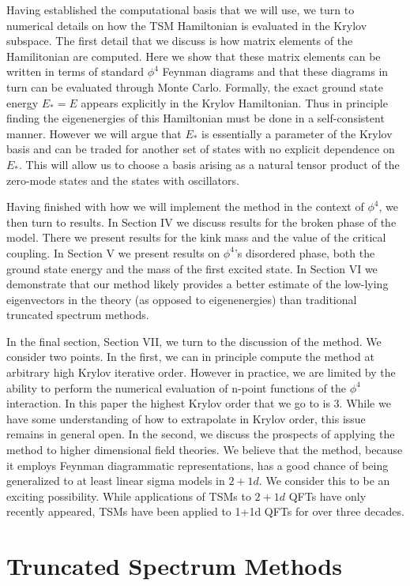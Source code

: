 \documentclass[twocolumn,secnumarabic,amssymb, nobibnotes, aps, prd]{revtex4-2}
\begin{document}
Having established the computational basis that we will use, we turn to numerical details on how the TSM Hamiltonian is evaluated in the Krylov subspace.  The first detail that we discuss is how matrix elements of the Hamilitonian are computed.  Here we show that these matrix elements can be written in terms of standard $\phi^4$ Feynman diagrams and that these diagrams in turn can be evaluated through Monte Carlo.
Formally, the exact ground state energy $E_*=E$ appears explicitly in the Krylov Hamiltonian. Thus in principle finding the eigenenergies of this Hamiltonian must be done in a self-consistent manner. However we will argue that $E_*$ is essentially a parameter of the Krylov basis and can be traded for another set of states with no explicit dependence on $E_*$.  This will allow us to choose a basis arising as a natural tensor product of the zero-mode states and the states with oscillators.

Having finished with how we will implement the method in the context of $\phi^4$, we then turn to results.  In Section IV we discuss results for the broken phase of the model.  There we present results for the kink mass and the value of the critical coupling.  In Section V we present results on $\phi^4$'s disordered phase, both the ground state energy and the mass of the first excited state.  In Section VI we demonstrate that our method likely provides a better estimate of the low-lying eigenvectors in the theory (as opposed to eigenenergies) than traditional truncated spectrum methods.

In the final section, Section VII, we turn to the discussion of the method.  We consider two points.  In the first, we can in principle compute the method at arbitrary high Krylov iterative order.  However in practice, we are limited by the ability to perform the numerical evaluation of n-point functions of the $\phi^4$ interaction.  In this paper the highest Krylov order that we go to is 3.  While we have some understanding of how to extrapolate in Krylov order, this issue remains in general open.  In the second, we discuss the prospects of applying the method to higher dimensional field theories.  We believe that the method, because it employs Feynman diagrammatic representations, has a good chance of being generalized to at least 
linear sigma models in $2+1d$.  We consider this to be an exciting possibility.  While applications of TSMs to $2+1d$ QFTs have only recently appeared, TSMs have been applied to 1+1d QFTs for over three decades. 


\section{Truncated Spectrum Methods}
\end{document}

